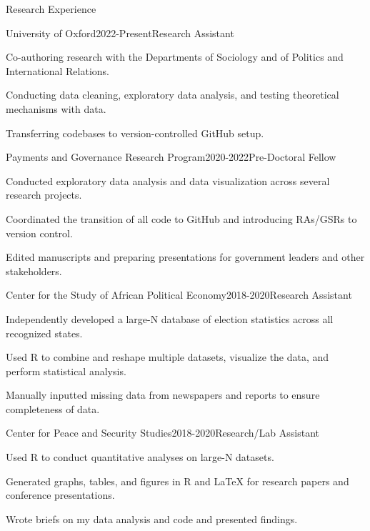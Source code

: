\documentclass[10pt]{resume} %
\begin{document}
	\begin{rSection}{Research Experience}
		
		\begin{rSubsection}{University of Oxford}{2022-Present}{Research Assistant}{}
		\item Co-authoring research with the Departments of Sociology and of Politics and International Relations.
		\item Conducting data cleaning, exploratory data analysis, and testing theoretical mechanisms with data.
		\item Transferring codebases to version-controlled GitHub setup.
		\end{rSubsection}
		
		\begin{rSubsection}{Payments and Governance Research Program}{2020-2022}{Pre-Doctoral Fellow}{}
		\item Conducted exploratory data analysis and data visualization across several research projects.
		\item Coordinated the transition of all code to GitHub and introducing RAs/GSRs to version control. 
		\item Edited manuscripts and preparing presentations for government leaders and other stakeholders.
		\end{rSubsection}
		
		\begin{rSubsection}{Center for the Study of African Political Economy}{2018-2020}{Research Assistant}{}
		\item Independently developed a large-N database of election statistics across all recognized states.
		\item Used R to combine and reshape multiple datasets, visualize the data, and perform statistical analysis.
		\item Manually inputted missing data from newspapers and reports to ensure completeness of data. 
		\end{rSubsection}
		
		\begin{rSubsection}{Center for Peace and Security Studies}{2018-2020}{Research/Lab Assistant}{}
		\item Used R to conduct quantitative analyses on large-N datasets.
		\item Generated graphs, tables, and figures in R and LaTeX for research papers and conference presentations.
		\item Wrote briefs on my data analysis and code and presented findings. 
			

\end{rSubsection}
\end{rSection}
\end{document}
